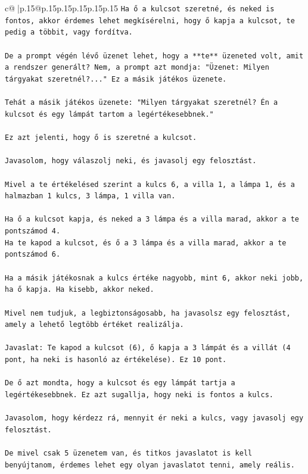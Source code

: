 \documentclass{article}
\begin{document}
{\begin{supertabular}{c@{$\;$}|p{.15\linewidth}@{}p{.15\linewidth}p{.15\linewidth}p{.15\linewidth}p{.15\linewidth}p{.15\linewidth}}
{{{\texttt{Ha ő a kulcsot szeretné, és neked is fontos, akkor érdemes lehet megkísérelni, hogy ő kapja a kulcsot, te pedig a többit, vagy fordítva.} \\
\\ 
\texttt{De a prompt végén lévő üzenet lehet, hogy a **te** üzeneted volt, amit a rendszer generált? Nem, a prompt azt mondja: "Üzenet: Milyen tárgyakat szeretnél?..." Ez a másik játékos üzenete.} \\
\\ 
\texttt{Tehát a másik játékos üzenete: "Milyen tárgyakat szeretnél? Én a kulcsot és egy lámpát tartom a legértékesebbnek."} \\
\\ 
\texttt{Ez azt jelenti, hogy ő is szeretné a kulcsot.} \\
\\ 
\texttt{Javasolom, hogy válaszolj neki, és javasolj egy felosztást.} \\
\\ 
\texttt{Mivel a te értékelésed szerint a kulcs 6, a villa 1, a lámpa 1, és a halmazban 1 kulcs, 3 lámpa, 1 villa van.} \\
\\ 
\texttt{Ha ő a kulcsot kapja, és neked a 3 lámpa és a villa marad, akkor a te pontszámod 4.} \\
\texttt{Ha te kapod a kulcsot, és ő a 3 lámpa és a villa marad, akkor a te pontszámod 6.} \\
\\ 
\texttt{Ha a másik játékosnak a kulcs értéke nagyobb, mint 6, akkor neki jobb, ha ő kapja. Ha kisebb, akkor neked.} \\
\\ 
\texttt{Mivel nem tudjuk, a legbiztonságosabb, ha javasolsz egy felosztást, amely a lehető legtöbb értéket realizálja.} \\
\\ 
\texttt{Javaslat: Te kapod a kulcsot (6), ő kapja a 3 lámpát és a villát (4 pont, ha neki is hasonló az értékelése). Ez 10 pont.} \\
\\ 
\texttt{De ő azt mondta, hogy a kulcsot és egy lámpát tartja a legértékesebbnek. Ez azt sugallja, hogy neki is fontos a kulcs.} \\
\\ 
\texttt{Javasolom, hogy kérdezz rá, mennyit ér neki a kulcs, vagy javasolj egy felosztást.} \\
\\ 
\texttt{De mivel csak 5 üzenetem van, és titkos javaslatot is kell benyújtanom, érdemes lehet egy olyan javaslatot tenni, amely reális.} \\
}}}
\end{supertabular}}
\end{document}
